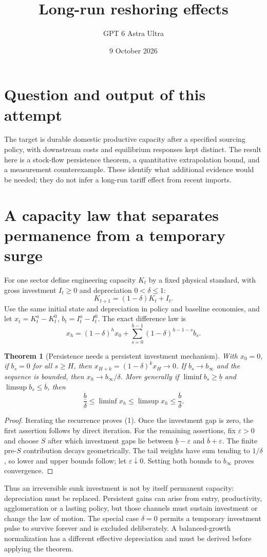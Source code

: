 \documentclass[11pt]{article}
\title{Long-run reshoring effects}
\author{GPT 6 Astra Ultra}
\date{9 October 2026}
\newtheorem{theorem}{Theorem}
\theoremstyle{definition}
\begin{document}
\maketitle
\section*{Question and output of this attempt}
The target is durable domestic productive capacity after a specified sourcing
policy, with downstream costs and equilibrium responses kept distinct. The
result here is a stock-flow persistence theorem, a quantitative extrapolation
bound, and a measurement counterexample. These identify what additional evidence
would be needed; they do not infer a long-run tariff effect from recent imports.

\section*{A capacity law that separates permanence from a temporary surge}
For one sector define engineering capacity $K_t$ by a fixed physical standard,
with gross investment $I_t\ge0$ and depreciation $0<\delta\le1$:
\[
 K_{t+1}=(1-\delta)K_t+I_t.
\]
Use the same initial state and depreciation in policy and baseline economies,
and let $x_t=K_t^a-K_t^0$, $b_t=I_t^a-I_t^0$. The exact difference law is
\[
 x_h=(1-\delta)^h x_0+
              \sum_{s=0}^{h-1}(1-\delta)^{h-1-s}b_s.      \tag{1}
\]
\begin{theorem}[Persistence needs a persistent investment mechanism]
With $x_0=0$, if $b_s=0$ for all $s\ge H$, then
$x_{H+k}=(1-\delta)^k x_H\to0$.
If $b_s\to b_\infty$ and the sequence is bounded, then
$x_h\to b_\infty/\delta$.
More generally if $\liminf b_s\ge\underline b$ and
$\limsup b_s\le\overline b$, then
\[
 \frac{\underline b}{\delta}\le\liminf x_h
 \le\limsup x_h\le\frac{\overline b}{\delta}.            \tag{2}
\]
\end{theorem}
\begin{proof}
Iterating the recurrence proves (1). Once the investment gap is zero, the
first assertion follows by direct iteration. For the remaining assertions,
fix $\varepsilon>0$ and choose $S$ after which investment gaps lie between
$\underline b-\varepsilon$ and $\overline b+\varepsilon$.
The finite pre-$S$ contribution decays geometrically. The tail weights have
sum tending to $1/\delta$, so lower and upper bounds follow; let
$\varepsilon\downarrow0$. Setting both bounds to $b_\infty$ proves convergence.
\end{proof}
Thus an irreversible sunk investment is not by itself permanent capacity:
depreciation must be replaced. Persistent gains can arise from entry,
productivity, agglomeration or a lasting policy, but those channels must sustain
investment or change the law of motion. The special case $\delta=0$ permits
a temporary investment pulse to survive forever and is excluded deliberately.
A balanced-growth normalization has a different effective depreciation and
must be derived before applying the theorem.
\end{document}
